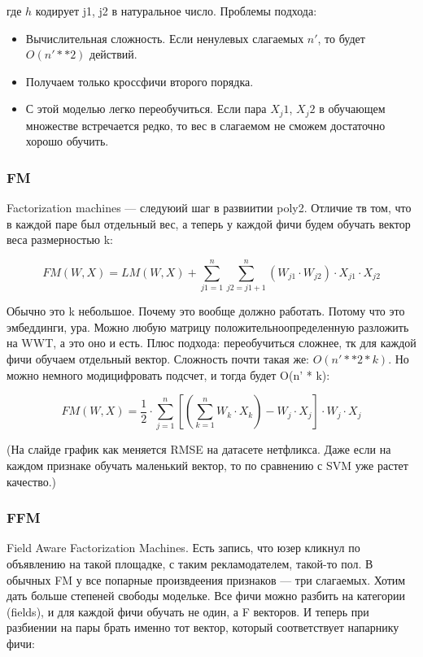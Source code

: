 \documentclass[12pt]{article}
\begin{document}
где $h$ кодирует j1, j2 в натуральное число. Проблемы подхода:
\begin{itemize}
    \item Вычислительная сложность. Если ненулевых слагаемых $n'$, то будет $O(n'**2)$ действий.
    \item Получаем только кроссфичи второго порядка.
    \item С этой моделью легко переобучиться. Если пара $X_j1$, $X_j2$ в обучающем множестве встречается редко, то вес в слагаемом не сможем достаточно хорошо обучить. 
\end{itemize}

\subsubsection{FM} 

Factorization machines --- следуюий шаг в развиитии poly2. Отличие тв том, что в каждой паре был отдельный вес, а теперь у каждой фичи будем обучать вектор веса размерностью k:

$$ FM(W, X) = LM(W, X) + \sum_{j1=1}^{n} {\sum_{j2=j1+1}^{n} (W_{j1} \cdot W_{j2})\cdot X_{j1} \cdot X_{j2}} $$

Обычно это k небольшое. Почему это вообще должно работать. Потому что это эмбеддинги, ура. Можно любую матрицу положительноопределенную разложить на WWT, а это оно и есть. Плюс подхода: переобучиться сложнее, тк для каждой фичи обучаем отдельный вектор. Сложность почти такая же: $O(n'**2 * k)$. Но можно немного модицифровать подсчет, и тогда будет O(n' * k):

$$ FM(W, X) = \frac{1}{2} \cdot \sum_{j=1}^{n} {[(\sum_{k=1}^{n} {W_k\cdot X_k}) - W_j\cdot X_j] \cdot W_j\cdot X_j} $$

(На слайде график как меняется RMSE на датасете нетфликса. Даже если на каждом признаке обучать маленький вектор, то по сравнению с SVM уже растет качество.)

\subsubsection{FFM} 

Field Aware Factorization Machines. Есть запись, что юзер кликнул по объявлению на такой площадке, с таким рекламодателем, такой-то пол. В обычных FM у все попарные произвдеения признаков --- три слагаемых. Хотим дать больше степеней свободы модельке. Все фичи можно разбить на категории (fields), и для каждой фичи обучать не один, а F векторов. И теперь при разбиении на пары брать именно тот вектор, который соответствует напарнику фичи:
\end{document}
